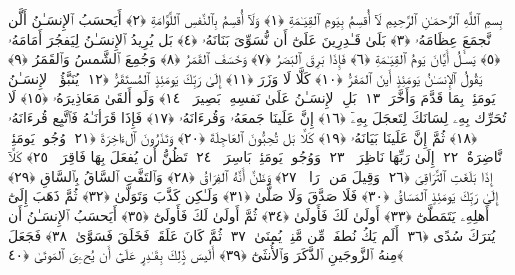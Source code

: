 
  
    
  
    
    

\nopagebreak
  بِسمِ ٱللَّهِ ٱلرَّحمَـٰنِ ٱلرَّحِيمِ
  لَآ أُقسِمُ بِيَومِ ٱلقِيَـٰمَةِ ﴿١﴾
 وَلَآ أُقسِمُ بِٱلنَّفسِ ٱللَّوَّامَةِ ﴿٢﴾
 أَيَحسَبُ ٱلإِنسَـٰنُ أَلَّن نَّجمَعَ عِظَامَهُۥ ﴿٣﴾
 بَلَىٰ قَـٰدِرِينَ عَلَىٰٓ أَن نُّسَوِّىَ بَنَانَهُۥ ﴿٤﴾
 بَل يُرِيدُ ٱلإِنسَـٰنُ لِيَفجُرَ أَمَامَهُۥ ﴿٥﴾
 يَسـَٔلُ أَيَّانَ يَومُ ٱلقِيَـٰمَةِ ﴿٦﴾
 فَإِذَا بَرِقَ ٱلبَصَرُ ﴿٧﴾
 وَخَسَفَ ٱلقَمَرُ ﴿٨﴾
 وَجُمِعَ ٱلشَّمسُ وَٱلقَمَرُ ﴿٩﴾
 يَقُولُ ٱلإِنسَـٰنُ يَومَئِذٍ أَينَ ٱلمَفَرُّ ﴿١٠﴾
 كَلَّا لَا وَزَرَ ﴿١١﴾
 إِلَىٰ رَبِّكَ يَومَئِذٍ ٱلمُستَقَرُّ ﴿١٢﴾
 يُنَبَّؤُا۟ ٱلإِنسَـٰنُ يَومَئِذٍۭ بِمَا قَدَّمَ وَأَخَّرَ ﴿١٣﴾
 بَلِ ٱلإِنسَـٰنُ عَلَىٰ نَفسِهِۦ بَصِيرَةٌۭ ﴿١٤﴾
 وَلَو أَلقَىٰ مَعَاذِيرَهُۥ ﴿١٥﴾
 لَا تُحَرِّك بِهِۦ لِسَانَكَ لِتَعجَلَ بِهِۦٓ ﴿١٦﴾
 إِنَّ عَلَينَا جَمعَهُۥ وَقُرءَانَهُۥ ﴿١٧﴾
 فَإِذَا قَرَأنَـٰهُ فَٱتَّبِع قُرءَانَهُۥ ﴿١٨﴾
 ثُمَّ إِنَّ عَلَينَا بَيَانَهُۥ ﴿١٩﴾
 كَلَّا بَل تُحِبُّونَ ٱلعَاجِلَةَ ﴿٢٠﴾
 وَتَذَرُونَ ٱلءَاخِرَةَ ﴿٢١﴾
 وُجُوهٌۭ يَومَئِذٍۢ نَّاضِرَةٌ ﴿٢٢﴾
 إِلَىٰ رَبِّهَا نَاظِرَةٌۭ ﴿٢٣﴾
 وَوُجُوهٌۭ يَومَئِذٍۭ بَاسِرَةٌۭ ﴿٢٤﴾
 تَظُنُّ أَن يُفعَلَ بِهَا فَاقِرَةٌۭ ﴿٢٥﴾
 كَلَّآ إِذَا بَلَغَتِ ٱلتَّرَاقِىَ ﴿٢٦﴾
 وَقِيلَ مَن ۜ رَاقٍۢ ﴿٢٧﴾
 وَظَنَّ أَنَّهُ ٱلفِرَاقُ ﴿٢٨﴾
 وَٱلتَفَّتِ ٱلسَّاقُ بِٱلسَّاقِ ﴿٢٩﴾
 إِلَىٰ رَبِّكَ يَومَئِذٍ ٱلمَسَاقُ ﴿٣٠﴾
 فَلَا صَدَّقَ وَلَا صَلَّىٰ ﴿٣١﴾
 وَلَـٰكِن كَذَّبَ وَتَوَلَّىٰ ﴿٣٢﴾
 ثُمَّ ذَهَبَ إِلَىٰٓ أَهلِهِۦ يَتَمَطَّىٰٓ ﴿٣٣﴾
 أَولَىٰ لَكَ فَأَولَىٰ ﴿٣٤﴾
 ثُمَّ أَولَىٰ لَكَ فَأَولَىٰٓ ﴿٣٥﴾
 أَيَحسَبُ ٱلإِنسَـٰنُ أَن يُترَكَ سُدًى ﴿٣٦﴾
 أَلَم يَكُ نُطفَةًۭ مِّن مَّنِىٍّۢ يُمنَىٰ ﴿٣٧﴾
 ثُمَّ كَانَ عَلَقَةًۭ فَخَلَقَ فَسَوَّىٰ ﴿٣٨﴾
 فَجَعَلَ مِنهُ ٱلزَّوجَينِ ٱلذَّكَرَ وَٱلأُنثَىٰٓ ﴿٣٩﴾
 أَلَيسَ ذَٟلِكَ بِقَـٰدِرٍ عَلَىٰٓ أَن يُحۦِىَ ٱلمَوتَىٰ ﴿٤٠﴾
 
